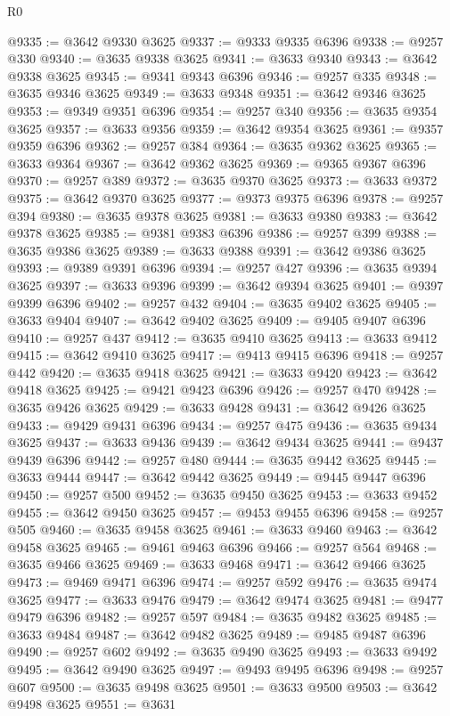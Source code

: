 \begin{lexlean}{R0}
\begin{coremodule}
@9335 := @3642 @9330 @3625
@9337 := @9333 @9335 @6396
@9338 := @9257 @330
@9340 := @3635 @9338 @3625
@9341 := @3633 @9340
@9343 := @3642 @9338 @3625
@9345 := @9341 @9343 @6396
@9346 := @9257 @335
@9348 := @3635 @9346 @3625
@9349 := @3633 @9348
@9351 := @3642 @9346 @3625
@9353 := @9349 @9351 @6396
@9354 := @9257 @340
@9356 := @3635 @9354 @3625
@9357 := @3633 @9356
@9359 := @3642 @9354 @3625
@9361 := @9357 @9359 @6396
@9362 := @9257 @384
@9364 := @3635 @9362 @3625
@9365 := @3633 @9364
@9367 := @3642 @9362 @3625
@9369 := @9365 @9367 @6396
@9370 := @9257 @389
@9372 := @3635 @9370 @3625
@9373 := @3633 @9372
@9375 := @3642 @9370 @3625
@9377 := @9373 @9375 @6396
@9378 := @9257 @394
@9380 := @3635 @9378 @3625
@9381 := @3633 @9380
@9383 := @3642 @9378 @3625
@9385 := @9381 @9383 @6396
@9386 := @9257 @399
@9388 := @3635 @9386 @3625
@9389 := @3633 @9388
@9391 := @3642 @9386 @3625
@9393 := @9389 @9391 @6396
@9394 := @9257 @427
@9396 := @3635 @9394 @3625
@9397 := @3633 @9396
@9399 := @3642 @9394 @3625
@9401 := @9397 @9399 @6396
@9402 := @9257 @432
@9404 := @3635 @9402 @3625
@9405 := @3633 @9404
@9407 := @3642 @9402 @3625
@9409 := @9405 @9407 @6396
@9410 := @9257 @437
@9412 := @3635 @9410 @3625
@9413 := @3633 @9412
@9415 := @3642 @9410 @3625
@9417 := @9413 @9415 @6396
@9418 := @9257 @442
@9420 := @3635 @9418 @3625
@9421 := @3633 @9420
@9423 := @3642 @9418 @3625
@9425 := @9421 @9423 @6396
@9426 := @9257 @470
@9428 := @3635 @9426 @3625
@9429 := @3633 @9428
@9431 := @3642 @9426 @3625
@9433 := @9429 @9431 @6396
@9434 := @9257 @475
@9436 := @3635 @9434 @3625
@9437 := @3633 @9436
@9439 := @3642 @9434 @3625
@9441 := @9437 @9439 @6396
@9442 := @9257 @480
@9444 := @3635 @9442 @3625
@9445 := @3633 @9444
@9447 := @3642 @9442 @3625
@9449 := @9445 @9447 @6396
@9450 := @9257 @500
@9452 := @3635 @9450 @3625
@9453 := @3633 @9452
@9455 := @3642 @9450 @3625
@9457 := @9453 @9455 @6396
@9458 := @9257 @505
@9460 := @3635 @9458 @3625
@9461 := @3633 @9460
@9463 := @3642 @9458 @3625
@9465 := @9461 @9463 @6396
@9466 := @9257 @564
@9468 := @3635 @9466 @3625
@9469 := @3633 @9468
@9471 := @3642 @9466 @3625
@9473 := @9469 @9471 @6396
@9474 := @9257 @592
@9476 := @3635 @9474 @3625
@9477 := @3633 @9476
@9479 := @3642 @9474 @3625
@9481 := @9477 @9479 @6396
@9482 := @9257 @597
@9484 := @3635 @9482 @3625
@9485 := @3633 @9484
@9487 := @3642 @9482 @3625
@9489 := @9485 @9487 @6396
@9490 := @9257 @602
@9492 := @3635 @9490 @3625
@9493 := @3633 @9492
@9495 := @3642 @9490 @3625
@9497 := @9493 @9495 @6396
@9498 := @9257 @607
@9500 := @3635 @9498 @3625
@9501 := @3633 @9500
@9503 := @3642 @9498 @3625
@9551 := @3631

\end{coremodule}
\end{lexlean}
